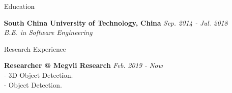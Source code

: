 \documentclass{resume} %
\begin{document}



\begin{rSection}{Education}

{\bf South China University of Technology, China } \hfill {\em Sep. 2014 - Jul. 2018} \\
{ \textit {B.E. in Software Engineering }} \\ 



\end{rSection}



\begin{rSection}{Research Experience}

{\bf Researcher @ Megvii Research } \hfill {\em Feb. 2019 - Now} \\
- 3D Object Detection. \\
- Object Detection.




\end{rSection}
\end{document}
